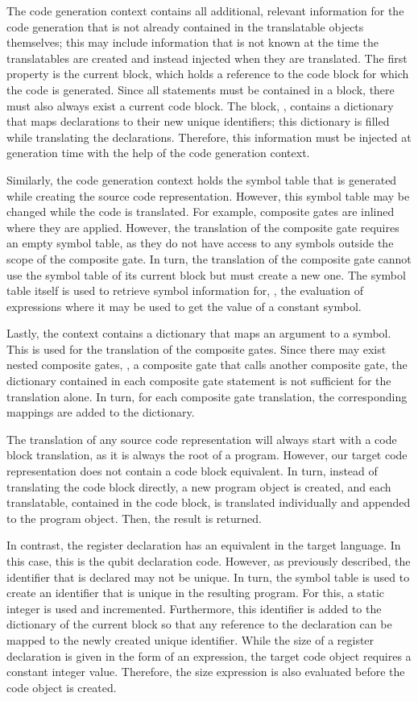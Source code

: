 The code generation context contains all additional, relevant information for the code generation that is not already contained in the translatable objects themselves; this may include information that is not known at the time the translatables are created and instead injected when they are translated. The first property is the current block, which holds a reference to the code block for which the code is generated. Since all statements must be contained in a block, there must also always exist a current code block. The block, \eg, contains a dictionary that maps declarations to their new unique identifiers; this dictionary is filled while translating the declarations. Therefore, this information must be injected at generation time with the help of the code generation context. 

Similarly, the code generation context holds the symbol table that is generated while creating the source code representation. However, this symbol table may be changed while the code is translated. For example, composite gates are inlined where they are applied. However, the translation of the composite gate requires an empty symbol table, as they do not have access to any symbols outside the scope of the composite gate. In turn, the translation of the composite gate cannot use the symbol table of its current block but must create a new one. The symbol table itself is used to retrieve symbol information for, \eg, the evaluation of expressions where it may be used to get the value of a constant symbol.

Lastly, the context contains a dictionary that maps an argument to a symbol. This is used for the translation of the composite gates. Since there may exist nested composite gates, \ie, a composite gate that calls another composite gate, the dictionary contained in each composite gate statement is not sufficient for the translation alone. In turn, for each composite gate translation, the corresponding mappings are added to the dictionary.

The translation of any source code representation will always start with a code block translation, as it is always the root of a program. However, our target code representation does not contain a code block equivalent. In turn, instead of translating the code block directly, a new program object is created, and each translatable, contained in the code block, is translated individually and appended to the program object. Then, the result is returned.

In contrast, the register declaration has an equivalent in the target language. In this case, this is the qubit declaration code. However, as previously described, the identifier that is declared may not be unique. In turn, the symbol table is used to create an identifier that is unique in the resulting program. For this, a static integer is used and incremented. Furthermore, this identifier is added to the dictionary of the current block so that any reference to the declaration can be mapped to the newly created unique identifier. While the size of a register declaration is given in the form of an expression, the target code object requires a constant integer value. Therefore, the size expression is also evaluated before the code object is created. 

